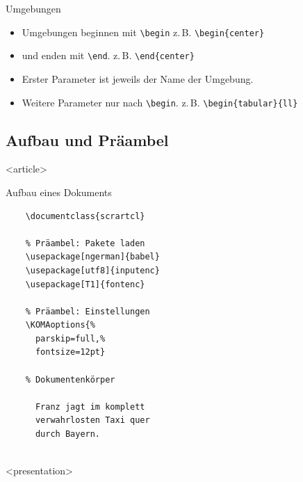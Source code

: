 \begin{Frame}[fragile]{Umgebungen}
  \begin{itemize}
    \item Umgebungen beginnen mit \lstinline-\begin-\newline
      z.\,B. \lstinline-\begin{center}-
    \item und enden mit \lstinline-\end-.\newline
      z.\,B. \lstinline-\end{center}-
    \item Erster Parameter ist jeweils der Name der Umgebung.
    \item Weitere Parameter nur nach \lstinline-\begin-.\newline
      z.\,B. \lstinline-\begin{tabular}{ll}-
  \end{itemize}
\end{Frame}

\subsection{Aufbau und Präambel}

\mode
<article>

\begin{Frame}[fragile]{Aufbau eines Dokuments}
  \begin{lstlisting}[gobble=4]
    % Dokumentenklasse
    \documentclass{scrartcl}

    % Präambel: Pakete laden
    \usepackage[ngerman]{babel}
    \usepackage[utf8]{inputenc}
    \usepackage[T1]{fontenc}

    % Präambel: Einstellungen
    \KOMAoptions{%
      parskip=full,%
      fontsize=12pt}

    % Dokumentenkörper
    
      Franz jagt im komplett
      verwahrlosten Taxi quer
      durch Bayern.
    
  \end{lstlisting}
\end{Frame}

\mode
<presentation>


